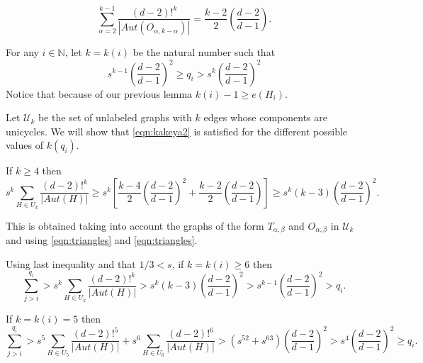 \documentclass[11pt,notitlepage,a4paper]{article}
\theoremstyle{definition}
\newcommand{\N}{\mathbb{N}}
\begin{document}
\begin{equation}  \label{eqn:cycles}
\sum_{\alpha=2}^{k-1}
\frac{(d-2)!^{k}}{|Aut(O_{\alpha,k-\alpha})|}= 
\frac{k-2}{2}\left( \frac{d-2}{d-1} \right).
\end{equation}

\par







For any $i\in \N$, let $k=k(i)$ be the natural number such that
\[
s^{k-1} \left(\frac{d-2}{d-1}\right)^2 \geq q_i > s^k 
\left(\frac{d-2}{d-1}\right)^2
\]
Notice that because of our previous lemma
$k(i)-1\geq e(H_i)$. \par
Let $\mathcal{U}_k$ be the set of unlabeled graphs with $k$ 
edges whose components are unicycles. We will show that
\cref{eqn:kakeya2} is satisfied for the different possible
values of $k(q_i)$. \par

If $k\geq 4$ then 
\[ s^k \sum_{H\in U_k}\frac{(d-2)!^k}{|Aut(H)|} 
\geq s^k\left[\frac{k-4}{2} \left( \frac{d-2}{d-1} \right)^2 +
\frac{k-2}{2} \left( \frac{d-2}{d-1} \right)\right] \geq 
s^k (k-3) \left( \frac{d-2}{d-1} \right)^2.
\]

This is obtained taking into account the graphs of the form
$T_{\alpha,\beta}$ and $O_{\alpha,\beta}$ in $\mathcal{U}_k$ and
using \cref{eqn:triangles} and \cref{eqn:triangles}.\par

Using last inequality and that
$1/3 < s$, if $k=k(i)\geq 6$ then
\[\sum_{j>i}^{q_i}>
s^k\sum_{H\in U_k}\frac{(d-2)!^k}{|Aut(H)|}
> s^k(k-3) \left( \frac{d-2}{d-1} \right)^2
> s^{k-1} \left( \frac{d-2}{d-1} \right)^2 > q_i.
\]

If $k=k(i)=5$ then
\[\sum_{j>i}^{q_i}>
s^5\sum_{H\in U_5}\frac{(d-2)!^5}{|Aut(H)|}
+ s^6\sum_{H\in U_6}\frac{(d-2)!^6}{|Aut(H)|}
> (s^52 + s^63) \left( \frac{d-2}{d-1} \right)^2 
> s^4 \left( \frac{d-2}{d-1} \right)^2 \geq q_i.
\]
\end{document}
